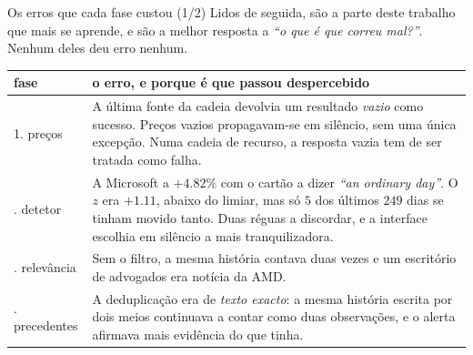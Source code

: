\documentclass[aspectratio=169]{beamer}
\begin{document}
\begin{frame}{Os erros que cada fase custou (1/2)}
\small
Lidos de seguida, são a parte deste trabalho que mais se aprende, e são a melhor resposta a
\emph{``o que é que correu mal?''}. Nenhum deles deu erro nenhum.
\vspace{3mm}

{\scriptsize
\begin{tabular}{@{}p{}p{}@{}}
\toprule
\textbf{fase} & \textbf{o erro, e porque é que passou despercebido} \\
\midrule
1. preços & A última fonte da cadeia devolvia um resultado \emph{vazio} como sucesso. Preços
vazios propagavam-se em silêncio, sem uma única excepção. Numa cadeia de recurso, a resposta
vazia tem de ser tratada como falha. \\
\addlinespace
2. detetor & A Microsoft a $+4.82\%$ com o cartão a dizer \emph{``an ordinary day''}. O $z$ era
$+1.11$, abaixo do limiar, mas só $5$ dos últimos $249$ dias se tinham movido tanto. Duas réguas
a discordar, e a interface escolhia em silêncio a mais tranquilizadora. \\
\addlinespace
3. relevância & Sem o filtro, a mesma história contava duas vezes e um escritório de advogados
era notícia da AMD. \\
\addlinespace
5. precedentes & A deduplicação era de \emph{texto exacto}: a mesma história escrita por dois
meios continuava a contar como duas observações, e o alerta afirmava mais evidência do que
tinha. \\
\bottomrule
\end{tabular}}
\end{frame}
\end{document}

